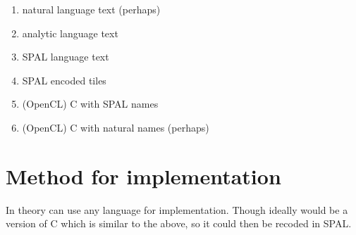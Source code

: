 \begin{enumerate}
  \item natural language text (perhaps)
  \item analytic language text
  \item SPAL language text
  \item SPAL encoded tiles
  \item (OpenCL) C with SPAL names
  \item (OpenCL) C with natural names (perhaps)
\end{enumerate}

\section{Method for implementation}
In theory can use any language for implementation.  
Though ideally would be a version of C which is similar to the above, 
so it could then be recoded in SPAL.\@


